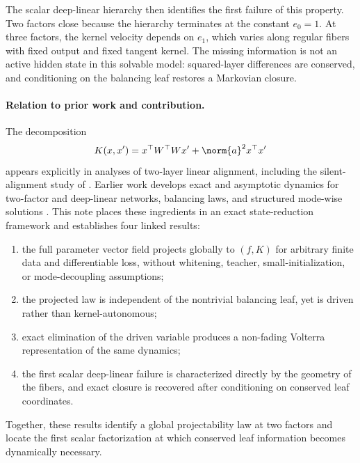 The scalar deep-linear hierarchy then identifies the first failure of this property.  Two factors close because the hierarchy terminates at the constant $e_0=1$.  At three factors, the kernel velocity depends on $e_1$, which varies along regular fibers with fixed output and fixed tangent kernel.  The missing information is not an active hidden state in this solvable model: squared-layer differences are conserved, and conditioning on the balancing leaf restores a Markovian closure.

\paragraph{Relation to prior work and contribution.}
The decomposition
\[
  K(x,x')=x^\top W^\top W x'+\norm{a}^2x^\top x'
\]
appears explicitly in analyses of two-layer linear alignment, including the silent-alignment study of \citet{atanasov2022silent}.  Earlier work develops exact and asymptotic dynamics for two-factor and deep-linear networks, balancing laws, and structured mode-wise solutions \citep{saxe2014deep,arora2018optimization,du2018balanced,xu2025three}.  This note places these ingredients in an exact state-reduction framework and establishes four linked results:
\begin{enumerate}
  \item the full parameter vector field projects globally to $(f,K)$ for arbitrary finite data and differentiable loss, without whitening, teacher, small-initialization, or mode-decoupling assumptions;
  \item the projected law is independent of the nontrivial balancing leaf, yet is driven rather than kernel-autonomous;
  \item exact elimination of the driven variable produces a non-fading Volterra representation of the same dynamics;
  \item the first scalar deep-linear failure is characterized directly by the geometry of the fibers, and exact closure is recovered after conditioning on conserved leaf coordinates.
\end{enumerate}
Together, these results identify a global projectability law at two factors and locate the first scalar factorization at which conserved leaf information becomes dynamically necessary.
